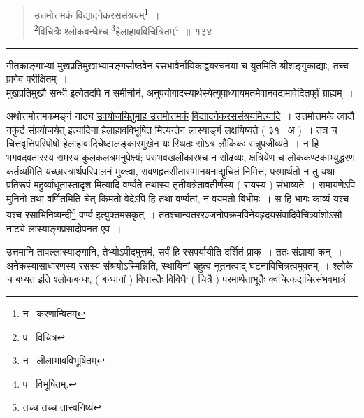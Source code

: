 \documentclass[11pt, openany]{book}
\begin{document}
\begin{quote}
{\na उत्तमोत्तमकं विद्यादनेकरससंश्रयम्\renewcommand{\thefootnote}{1}\footnote{न \textendash\ करणान्वितम्}~।\\
\renewcommand{\thefootnote}{2}\footnote{प \textendash\ विचित्र}विचित्रैः श्लोकबन्धैश्च \renewcommand{\thefootnote}{3}\footnote{न \textendash\ लीलाभावविभूषितम्}हेलाहावविचित्रितम्\renewcommand{\thefootnote}{4}\footnote{प \textendash\ विभूषितम्.}~॥~१३४}
\end{quote}

\hrule

\vspace{2mm}
गीतकाङ्गाभ्यां मुखप्रतिमुखाभ्यामङ्गसौष्ठवेन रसभावैर्नायिकाद्वयरचनया च युतमिति श्रीशङ्गुकाद्याः, तच्च प्रागेव परीक्षितम्~।\\

मुखप्रतिमुखौ सन्धी इत्येतदपि न समीचीनं, अनुपयोगादस्यार्थस्येत्युपाध्यायमतमेवानवद्यमावेदितपूर्वं ग्राह्यम्~।\\

\begin{sloppypar}
अथोत्तमोत्तमकमङ्गं नाट्य \underline{उपयोजयितुमाह उत्तमोत्तमकं} \underline{विद्यादनेकरससंश्रयमित्यादि}~। {\qt उत्तमोत्तमके त्वादौ नर्कुटं संप्रयोजयेत्} इत्यादिना {\qt हेलाहावविभूषित} मित्यन्तेन लास्याङ्गं लक्षयिष्यते ( ३१ \textendash\ अ )~। तत्र च चित्तवृत्तिपरिपोषो हेलाहावादिचेष्टालङ्कारमुखेन यः स्थितः सोऽत्र लौकिकः सन्नुपजीव्यते~। न हि भगवदवतारस्य रामस्य कुलकलत्रमनुपेक्ष्यं; पराभवखलीकारश्च न सोढव्यः, क्षत्रियेण च लोककण्टकाभ्युद्धरणं कर्तव्यमिति यच्छास्त्रार्थपरिपालनं मुक्त्वा, रावणहृतसीतासमानयनाद्युचितं निमित्तं, परमार्थतो न तु यथा प्रतिरूपं {\qt महुर्व्याधूतास्तादृश} मित्यादि वर्ण्यते तथास्य तृतीयत्रेतावतीर्णस्य ( रायस्य ) संभाव्यते~। रामायणेऽपि मुनिनो तथा वर्णितमिति चेत् किमतो वेदेऽपि हि तथा वर्ण्यतां, न वयमतो बिभीमः~। स हि भागः काव्यं यश्च यश्च रसाभिनिष्यन्दी\renewcommand{\thefootnote}{1}\footnote{तच्च तच्च तास्वनिष्यं} वर्ण्य इत्युक्तमसकृत्~। ततश्चान्यतररञ्जनोपक्रमविनेयहृदयसंवादिवैचित्र्यांशोऽसौ नाट्ये लास्याङ्गप्रसादोपनत एव~।\\
\end{sloppypar}

उत्तमानि तावल्लास्याङ्गानि, तेभ्योऽपीदमुत्तमं, सर्वं हि रसपर्यायीति दर्शितं प्राक्~। ततः संज्ञायां कन्~।\\

अनेकस्यासाधारणस्य रसस्य संश्रयोऽस्मिन्निति, स्थायिनां बहुत्व नूतनत्वाद् घटनाविचित्रत्वमुक्तम्~। श्लोके च बध्यत इति श्लोकबन्धः, ( बन्धानां ) विधास्तैः विविधैः ( चित्रै ) परमार्थताभूतैः क्वचित्कदाचित्संभवमात्रं
\end{document}
